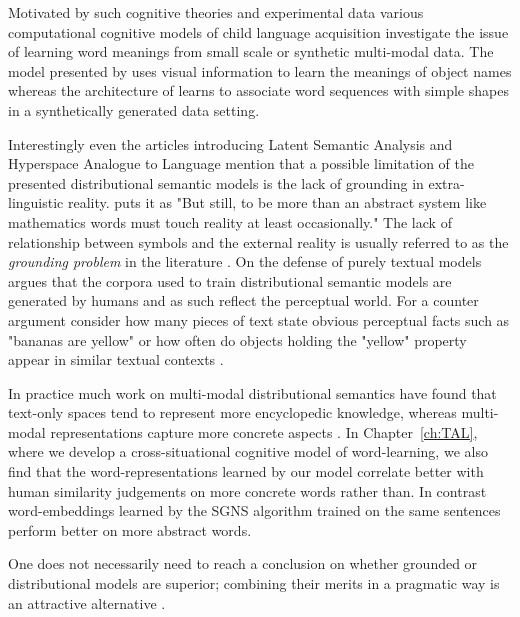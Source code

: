 Motivated by such cognitive theories and experimental data
various computational cognitive models of child
language acquisition investigate the issue
of learning word meanings from small scale or synthetic multi-modal data. The model presented by
\cite{yu2005emergence} uses visual information to learn the meanings of object
names whereas the architecture of \cite{roy2002learning} learns to associate word sequences
with simple shapes in a synthetically generated data setting.

Interestingly even the articles introducing Latent Semantic Analysis
\citep{landauer1997solution} and Hyperspace Analogue to Language \citep{lund1996producing} mention
that a possible limitation of the presented distributional semantic models is the lack of
grounding in extra-linguistic reality. \cite{landauer1997solution} puts it as "But still, to be more than
an abstract system like mathematics words must touch reality at least occasionally."
The lack of relationship between symbols and the external reality is usually referred
to as the \emph{grounding problem} in the literature \citep{harnad1990symbol,perfetti1998limits}.
On the defense of purely textual models \cite{louwerse2011symbol} argues that the corpora
used to train distributional semantic models are generated by humans and as such reflect the perceptual world.
For a counter argument consider how many pieces of text state obvious perceptual
facts such as "bananas are yellow" or how often do objects holding the "yellow" property
appear in similar textual contexts \citep{bruni2014multimodal}.

In practice much work on multi-modal distributional semantics have found that text-only spaces tend to
represent more encyclopedic knowledge, whereas multi-modal representations capture more concrete aspects
\citep{andrews2009integrating,baroni2008concepts}. In Chapter~\ref{ch:TAL}, where we develop
a cross-situational cognitive model of word-learning, we also find that the word-representations learned by
our model correlate better with human similarity judgements on more concrete words rather than.
In contrast word-embeddings learned by the SGNS algorithm trained on the same sentences
perform better on more abstract words.

One does not necessarily need to reach a conclusion on whether grounded or distributional
models are superior;  combining their merits in a
pragmatic way is an attractive alternative \citep{riordan2011redundancy}.


